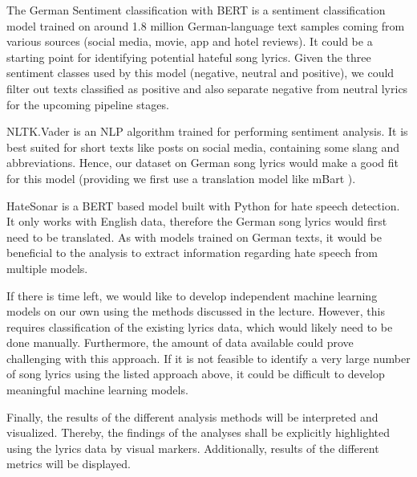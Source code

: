 The German Sentiment classification with BERT \cite{guhr2020training} is a sentiment classification model trained on around 1.8 million German-language text samples coming from various sources (social media, movie, app and hotel reviews). It could be a starting point for identifying potential hateful song lyrics. Given the three sentiment classes used by this model (negative, neutral and positive), we could filter out texts classified as positive and also separate negative from neutral lyrics for the upcoming pipeline stages.

NLTK.Vader \cite{vader} is an NLP algorithm trained for performing sentiment analysis. It is best suited for short texts like posts on social media, containing some slang and abbreviations. Hence, our dataset on German song lyrics would make a good fit for this model (providing we first use a translation model like mBart \cite{mBart}).

HateSonar \cite{davidson2017automated} is a BERT based model built with Python for hate speech detection. It only works with English data, therefore the German song lyrics would first need to be translated. As with models trained on German texts, it would be beneficial to the analysis to extract information regarding hate speech from multiple models.

If there is time left, we would like to develop independent machine learning models on our own using the methods discussed in the lecture. However, this requires classification of the existing lyrics data, which would likely need to be done manually. Furthermore, the amount of data available could prove challenging with this approach. If it is not feasible to identify a very large number of song lyrics using the listed approach above, it could be difficult to develop meaningful machine learning models.

Finally, the results of the different analysis methods will be interpreted and visualized. Thereby, the findings of the analyses shall be explicitly highlighted using the lyrics data by visual markers. Additionally, results of the different metrics will be displayed. 
